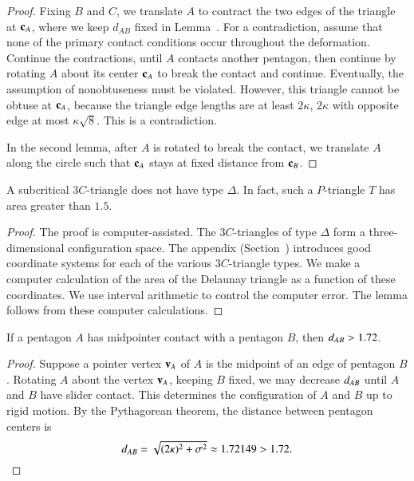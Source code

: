 \begin{proof} Fixing $B$ and $C$, we translate $A$ to contract the two
  edges of the triangle at ${\mathbf c}_A$, where we keep $d_{AB}$ fixed in
  Lemma~.  For a contradiction, assume that none
  of the primary contact conditions occur throughout the deformation.
  Continue the contractions, until $A$ contacts another pentagon, then
  continue by rotating $A$ about its center ${\mathbf c}_A$ to break the
  contact and continue.  Eventually, the assumption of nonobtuseness
  must be violated.  However, this triangle cannot be obtuse at
  ${\mathbf c}_A$, because the triangle edge lengths are at least $2 \kappa$,
  $2 \kappa$ with opposite edge at most $\kappa\sqrt{8}$. This is a
  contradiction.

  In the second lemma, after $A$ is rotated to break the contact, we
  translate $A$ along the circle such that ${\mathbf c}_A$ stays at fixed
  distance from ${\mathbf c}_B$.
\end{proof}

\begin{lemma} 
  A subcritical $3C$-triangle does not have type $\Delta$.  In fact,
  such a $P$-triangle $T$ has area greater than $1.5$.
\end{lemma}

\begin{proof} The proof is computer-assisted.  The $3C$-triangles of
  type $\Delta$ form a three-dimensional configuration space.  The
  appendix (Section~) introduces good coordinate
  systems for each of the various $3C$-triangle types.  We make a
  computer calculation of the area of the Delaunay triangle as a
  function of these coordinates.  We use interval arithmetic to
  control the computer error.  The lemma follows from these computer
  calculations.
\end{proof}



\begin{lemma}  
  If a pentagon $A$ has midpointer contact with a pentagon $B$, then
  $d_{AB} > 1.72$.
\end{lemma}

\begin{proof} Suppose a pointer vertex ${\mathbf v}_A$ of $A$ is the midpoint of an
  edge of pentagon $B$.  Rotating $A$ about the vertex ${\mathbf v}_A$, keeping
  $B$ fixed, we may decrease $d_{AB}$ until $A$ and $B$
  have slider contact.  This determines the configuration of $A$ and
  $B$ up to rigid motion.  By the Pythagorean theorem, the
  distance between pentagon centers is
\[
d_{AB} = \sqrt{(2\kappa)^2 + \sigma^2} \approx 1.72149 > 1.72.
\] %
\end{proof}

